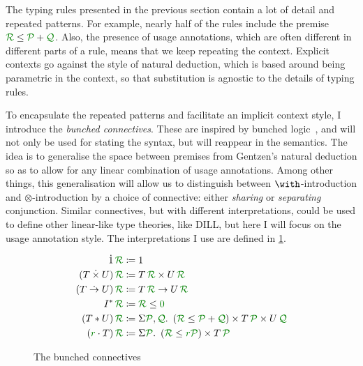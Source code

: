 
The typing rules presented in the previous section contain a lot of detail and
repeated patterns.
For example, nearly half of the rules include the premise
$\grR \leq \grP + \grQ$.
Also, the presence of usage annotations, which are often different in different
parts of a rule, means that we keep repeating the context.
Explicit contexts go against the style of natural deduction, which is based
around being parametric in the context, so that substitution is agnostic to the
details of typing rules.

To encapsulate the repeated patterns and facilitate an implicit context style,
I introduce the \emph{bunched connectives}.
These are inspired by bunched logic~\cite{oHP99}, and will not only be used for
stating the syntax, but will reappear in the semantics.
The idea is to generalise the space between premises from Gentzen's natural
deduction so as to allow for any linear combination of usage annotations.
Among other things, this generalisation will allow us to distinguish between
$\with$-introduction and $\otimes$-introduction by a choice of connective:
either \emph{sharing} or \emph{separating} conjunction.
Similar connectives, but with different interpretations, could be used to
define other linear-like type theories, like DILL, but here I will focus on the
usage annotation style.
The interpretations I use are defined in \cref{fig:bunched}.

\begin{figure}
  \begin{align*}
    \dot1\,\grR &\coloneqq 1 \\
    (T \dottimes U)\,\grR &\coloneqq T\,\grR \times U\,\grR \\
    (T \dotto U)\,\grR &\coloneqq T\,\grR \to U\,\grR \\
    I^*\,\grR &\coloneqq \grR \leq \gr0 \\
    (T \sep U)\,\grR &\coloneqq \Sigma \grP,\grQ.~ \plr{\grR \leq \grP + \grQ}
                       \times T\,\grP \times U\,\grQ \\
    (\gr r \cdot T)\,\grR &\coloneqq \Sigma \grP.~ \plr{\grR \leq \gr r\grP}
                       \times T\,\grP
  \end{align*}
  \caption{The bunched connectives}
  \label{fig:bunched}
\end{figure}

